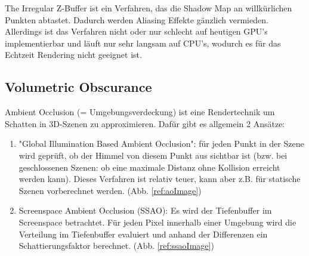 \documentclass[runningheaders,a4paper]{llncs}
\begin{document}
The Irregular Z-Buffer \cite{irregular} ist ein Verfahren, das die Shadow Map an willkürlichen Punkten abtastet.
Dadurch werden Aliasing Effekte gänzlich vermieden.
Allerdings ist das Verfahren nicht oder nur schlecht auf heutigen GPU's implementierbar und läuft nur sehr langsam auf CPU's, wodurch es für das Echtzeit Rendering nicht geeignet ist.


\subsection{Volumetric Obscurance}

Ambient Occlusion (= Umgebungsverdeckung) ist eine Rendertechnik um Schatten in 3D-Szenen
zu approximieren. Dafür gibt es allgemein 2 Ansätze:
\begin{enumerate}
	\item "Global Illumination Based Ambient Occlusion": für jeden Punkt in der Szene wird geprüft, ob der Himmel von diesem
		Punkt aus sichtbar ist (bzw. bei geschlossenen Szenen: ob eine maximale Distanz ohne Kollision erreicht
		 werden kann). Dieses Verfahren ist relativ teuer, kann aber z.B. für statische Szenen vorberechnet
		 werden. (Abb. \ref{ref:aoImage})
		\cite{aoPaper}
	\item Screenspace Ambient Occlusion (SSAO): Es wird der Tiefenbuffer im Screenspace betrachtet. Für jeden Pixel innerhalb einer Umgebung wird die Verteilung im Tiefenbuffer evaluiert und anhand der Differenzen
	ein Schattierungsfaktor berechnet. (Abb. \ref{ref:ssaoImage})  \cite{cry2Paper}
\end{enumerate}  
\end{document}
